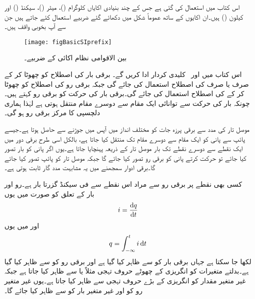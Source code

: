 اس کتاب میں  استعمال کی گئی ہے جس کے چند بنیادی اکایاں کلوگرام ()، میٹر ()، سیکنڈ () اور کیلون () ہیں۔ان اکایوں کے ساتھ عموماً شکل  میں دکھائے گئے ضربیے استعمال کئے جاتے ہیں جن سے آپ بخوبی واقف ہیں۔
\begin{figure}
\centering
\texttt{[image: figBasicSIprefix]}
\caption{بین الاقوامی نظام اکائی کے ضربیے۔}
\label{شکل_بنیادی_سابقہ}
\end{figure}

اس کتاب میں   اور
   \,  کلیدی کردار ادا کریں گے۔ برقی بار کی اصطلاح کو چھوٹا کر کے صرف  یا صرف  کی اصطلاح استعمال کی جائے گی جبکہ برقی رو کی اصطلاح کو چھوٹا کر کے  کی اصطلاح استعمال کی جائے گی۔برقی بار کی حرکت کو برقی رو کہتے ہیں۔چونکہ بار کی حرکت سے توانائی ایک مقام سے دوسرے مقام منتقل ہوتی ہے لہٰذا ہماری دلچسپی کا مرکز برقی رو ہو گی۔

موصل تار  کی مدد سے برقی پرزہ جات کو مختلف انداز میں آپس میں جوڑنے سے  حاصل ہوتا ہے۔جیسے پائپ سے پانی کو ایک مقام سے دوسرے مقام تک منتقل کیا جاتا ہے، بالکل اسی طرح برقی دور میں ایک نقطے سے دوسرے نقطے تک بار موصل تار کے ذریعہ پہنچایا جاتا ہے۔یوں اگر پانی کو بار تصور کیا جائے تو حرکت کرتے پانی کو برقی رو تصور کیا جائے گا جبکہ موصل تار کو پائپ تصور کیا جائے گا۔برقی ادوار سمجھنے میں یہ مشابہت مدد گار ثابت ہوتی ہے۔  

کسی بھی نقطے پر برقی رو سے مراد اس نقطے سے فی سیکنڈ گزرتا بار  ہے۔رو اور بار کے تعلق کو  صورت میں یوں
\begin{align}\label{مساوات_بنیادی_رو_تعریف}
i=\frac{\dif q}{\dif t}
\end{align}
اور  میں یوں
\begin{align}
q=\int_{-\infty}^{t} i \dif t
\end{align}
لکھا جا سکتا ہے جہاں برقی بار کو  سے ظاہر کیا گیا ہے اور برقی رو کو  سے ظاہر کیا گیا ہے۔بدلتے متغیرات کو انگریزی کے چھوٹے حروف تہجی  مثلاً  یا  سے ظاہر کیا جاتا ہے جبکہ غیر متغیر مقدار کو انگریزی کے بڑے حروف تہجی سے ظاہر کیا جاتا ہے۔یوں غیر متغیر رو کو  اور غیر متغیر بار کو  سے ظاہر کیا جائے گا۔

